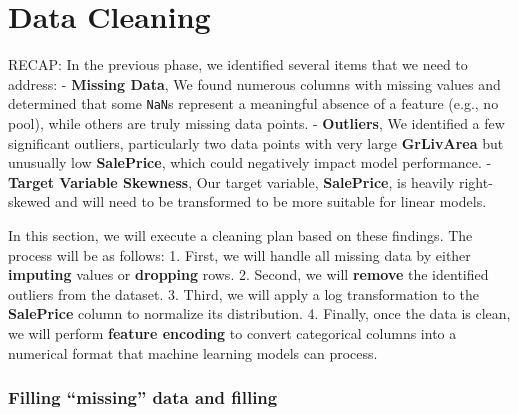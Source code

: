\documentclass[11pt]{article}
\begin{document}
    \section{Data Cleaning}\label{data-cleaning}

    RECAP: In the previous phase, we identified several items that we need
to address: - \textbf{Missing Data}, We found numerous columns with
missing values and determined that some \texttt{NaN}s represent a
meaningful absence of a feature (e.g., no pool), while others are truly
missing data points. - \textbf{Outliers}, We identified a few
significant outliers, particularly two data points with very large
\textbf{GrLivArea} but unusually low \textbf{SalePrice}, which could
negatively impact model performance. - \textbf{Target Variable
Skewness}, Our target variable, \textbf{SalePrice}, is heavily
right-skewed and will need to be transformed to be more suitable for
linear models.

In this section, we will execute a cleaning plan based on these
findings. The process will be as follows: 1. First, we will handle all
missing data by either \textbf{imputing} values or \textbf{dropping}
rows. 2. Second, we will \textbf{remove} the identified outliers from
the dataset. 3. Third, we will apply a log transformation to the
\textbf{SalePrice} column to normalize its distribution. 4. Finally,
once the data is clean, we will perform \textbf{feature encoding} to
convert categorical columns into a numerical format that machine
learning models can process.

    \subsubsection{Filling ``missing'' data and
filling}\label{filling-missing-data-and-filling}
\end{document}
